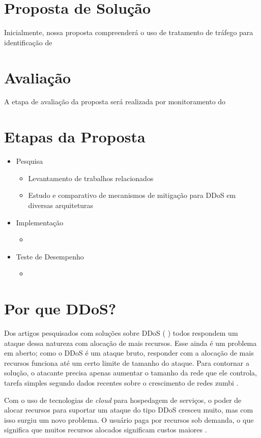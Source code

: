 \documentclass[a4paper, 11pt]{article}
\begin{document}
\section{Proposta de Solu\c{c}\~{a}o}
Inicialmente, nossa proposta compreender\'a o uso de tratamento de tr\'afego
para identifica\c{c}\~{a}o de 

\section{Avalia\c{c}\~{a}o}
A etapa de avalia\c{c}\~{a}o da proposta ser\'a realizada por monitoramento do 

\section{Etapas da Proposta}
\begin{itemize}
 \item Pesquisa
  \begin{itemize}
    \item Levantamento de trabalhos relacionados
    \item Estudo e comparativo de  mecanismos de mitiga\c{c}\~{a}o para
DDoS em diversas arquiteturas 

  \end{itemize}
 \item Implementa\c{c}\~{a}o
  \begin{itemize}
    \item %
  \end{itemize}
 \item Teste de Desempenho 
  \begin{itemize}
    \item %
  \end{itemize}
\end{itemize}

\section{Por que DDoS?}
Dos artigos pesquisados com soluções sobre DDoS (\cite{Zhang:11} \cite{Zuckerman:10} \cite{Soon:10}) todos respondem um ataque dessa natureza com alocação de mais recursos. Esse ainda é um problema em aberto; como o DDoS é um ataque bruto, responder com a alocação de mais recursos funciona até um certo limite de tamanho do ataque. Para contornar a solução, o atacante precisa apenas aumentar o tamanho da rede que ele controla, tarefa simples segundo dados recentes sobre o crescimento de redes zumbi \cite{Chao:09}.

Com o uso de tecnologias de \emph{cloud} para hospedagem de serviços, o poder de alocar recursos para suportar um ataque do tipo DDoS cresceu muito, mas com isso surgiu um novo problema. O usuário paga por recursos sob demanda, o que significa que muitos recursos alocados significam custos maiores \cite{Soon:10}.


\newpage


\end{document}
